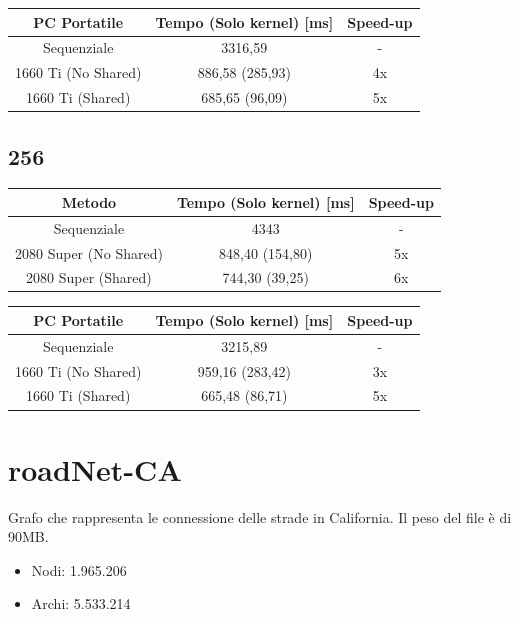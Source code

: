 \documentclass[12pt,a4paper]{report}
\begin{document}
				\bigbreak
				
				\begin{tabular}{|c|c|c|}
					\hline
					PC Portatile & Tempo (Solo kernel) [ms] & Speed-up \\
					\hline
					Sequenziale & 3316,59 & -  \\
					\hline
					1660 Ti (No Shared) & 886,58 (285,93) & 4x \\
					\hline
					1660 Ti (Shared) & 685,65 (96,09) & 5x \\
					\hline
				\end{tabular}

			\subsection{256}
			
				\begin{tabular}{|c|c|c|}
					\hline
					Metodo & Tempo (Solo kernel) [ms] & Speed-up \\
					\hline
					Sequenziale & 4343 & -  \\
					\hline
					2080 Super (No Shared) & 848,40 (154,80) & 5x \\
					\hline
					2080 Super (Shared) & 744,30 (39,25) & 6x \\
					\hline
				\end{tabular}
				
				\bigbreak
				
				\begin{tabular}{|c|c|c|}
					\hline
					PC Portatile & Tempo (Solo kernel) [ms] & Speed-up \\
					\hline
					Sequenziale & 3215,89 & -  \\
					\hline
					1660 Ti (No Shared) & 959,16 (283,42) & 3x \\
					\hline
					1660 Ti (Shared) & 665,48 (86,71) & 5x \\
					\hline
				\end{tabular}

		\section{roadNet-CA}
		
			Grafo che rappresenta le connessione delle strade in California.
			Il peso del file è di 90MB.
		
			\begin{itemize}
				\item Nodi: 1.965.206
				\item Archi: 5.533.214
			\end{itemize}
				
\end{document}
